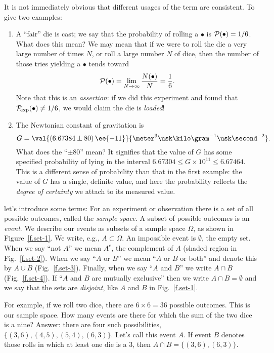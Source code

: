 It is not immediately obvious that different usages of the term are consistent. To give two examples:

\begin{enumerate}
\item A ``fair'' die is cast; we say that the probability of rolling a $\bullet$ is $\mathcal{P}(\bullet) = 1/6$.  What does this mean?  We may mean that if we were to roll the die a very large number of times $N$, or roll a large number $N$ of dice, then the number of those tries yielding a $\bullet$ tends toward
\[ \mathcal{P}(\bullet) = \lim_{N\to\infty} \frac{N(\bullet)}{N} = \frac{1}{6}. \]
Note that this is an \emph{assertion}: if we did this experiment and found that $\mathcal{P}_{\!\mathrm{exp}}(\bullet) \neq 1/6$, we would claim the die is \emph{loaded}!

\item The Newtonian constant of gravitation is
\[ G = \val{\left(6.67384\pm80\right)\ee{-11}}{\meter^{3}\usk\kilo\gram^{-1}\usk\second^{-2}}. \]
What does the ``$\pm80$'' mean? It signifies that the value of $G$ has some specified probability of lying in the interval $6.67304\leq G\times 10^{11} \leq 6.67464$.
This is a different sense of probability than that in the first example: the value of $G$ has a single, definite value, and here the probability reflects the \emph{degree of certainty} we attach to its measured value.
\end{enumerate}

 let's introduce some terms\cite{Durrett1994The-Essentials-}:
For an experiment or observation there is a set of all possible outcomes, called the 
\emph{sample space}. A subset of possible outcomes is an \emph{event}.
We describe our events as subsets of a sample space $\Omega$, as shown in Figure~\ref{f.set-1}.  We write, e.g., $A \subset \Omega$. An impossible event is $\emptyset$, the empty set.  When we say ``not $A$'' we mean $A^{c}$,  the complement of $A$ (shaded region in Fig.~\ref{f.set-2}).
When we say ``$A$ or $B$'' we mean ``$A$ or $B$ or both'' and denote this by $A\cup B$ (Fig.~\ref{f.set-3}).
Finally, when we say ``$A$ and $B$'' we write $A\cap B$ (Fig.~\ref{f.set-4}).  If ``$A$ and $B$ are mutually exclusive'' then we write $A\cap B =\emptyset$ and we say that the sets are 
\emph{disjoint}, like $A$ and $B$ in Fig.~\ref{f.set-1}.

For example, if we roll two dice, there are $6\times 6 = 36$ possible outcomes. This is our sample space.  How many events are there for which the sum of the two dice is a nine?  Answer: there are four such possibilities, $\{(3,6),(4,5),(5,4),(6,3)\}$. Let's call this event $A$.  If event $B$ denotes those rolls in which at least one die is a 3, then $A\cap B = \{(3,6),(6,3)\}$. 


